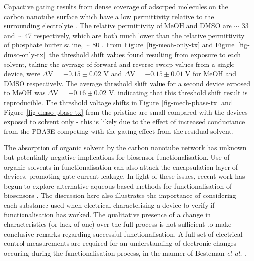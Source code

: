 \documentclass[
  a4paper,
]{scrbook}
\begin{document}
Capactive gating results from dense coverage of adsorped molecules on
the carbon nanotube surface which have a low permittivity relative to
the surrounding electrolyte \autocite{Heller2008}. The relative
permittivity of MeOH and DMSO are \(\sim\) 33 \autocite{Mohsen-Nia2010}
and \(\sim\) 47 \autocite{Hunger2010} respectively, which are both much
lower than the relative permittivity of phosphate buffer saline,
\(\sim\) 80 \autocite{Shkodra2021}. From Figure~\ref{fig-meoh-only-tx}
and Figure~\ref{fig-dmso-only-tx}, the threshold shift values found
resulting from exposure to each solvent, taking the average of forward
and reverse sweep values from a single device, were \(\Delta\)V =
\(-0.15 \pm 0.02\) V and \(\Delta\)V = \(-0.15 \pm 0.01\) V for MeOH and
DMSO respectively. The average threshold shift value for a second device
exposed to MeOH was \(\Delta\)V = \(-0.16 \pm 0.02\) V, indicating that
this threshold shift result is reproducible. The threshold voltage
shifts in Figure~\ref{fig-meoh-pbase-tx} and
Figure~\ref{fig-dmso-pbase-tx} from the pristine are small compared with
the devices exposed to solvent only - this is likely due to the effect
of increased conductance from the PBASE competing with the gating effect
from the residual solvent.

The absorption of organic solvent by the carbon nanotube network has
unknown but potentially negative implications for biosensor
functionalisation. Use of organic solvents in functionalisation can also
attack the encapsulation layer of devices, promoting gate current
leakage. In light of these issues, recent work has begun to explore
alternative aqueous-based methods for functionalisation of biosensors
\autocite{Khan2021}. The discussion here also illustrates the importance
of considering each substance used when electrical characterising a
device to verify if functionalisation has worked. The qualitative
presence of a change in characteristics (or lack of one) over the full
process is not sufficient to make conclusive remarks regarding
successful functionalisation. A full set of electrical control
measurements are required for an understanding of electronic changes
occuring during the functionalisation process, in the manner of Besteman
\emph{et al.} \autocite{Besteman2003}.

\newpage
{}

\hfill\break
\hfill\break
\end{document}
